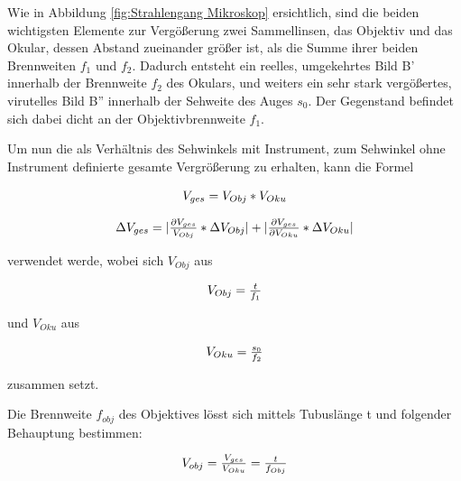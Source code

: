 \documentclass[12pt,a4paper,twoside]{article}
\begin{document}
\noindent
Wie in Abbildung \ref{fig:Strahlengang Mikroskop} ersichtlich, sind die beiden wichtigsten Elemente zur Vergößerung zwei Sammellinsen, das Objektiv und das Okular, dessen Abstand zueinander größer ist, als die Summe ihrer beiden Brennweiten $f_{1}$ und $f_{2}$. 
Dadurch entsteht ein reelles, umgekehrtes Bild B' innerhalb der Brennweite $f_{2}$ des Okulars, und weiters ein sehr stark vergößertes, virutelles Bild B'' innerhalb der Sehweite des Auges $s_{0}$. Der Gegenstand befindet sich dabei dicht an der Objektivbrennweite $f_{1}$. \newline

\noindent
Um nun die als Verhältnis des Sehwinkels mit Instrument, zum Sehwinkel ohne Instrument definierte gesamte Vergrößerung zu erhalten, kann die Formel

    \begin{equation}
        \label{eq:Gesamtvergrößerung}
        \centerline{$V_{ges}=V_{Obj}*V_{Oku}$}
    \end{equation}

    \begin{equation}
        \label{eq:Unsicherheit_Gesamtvergrößerung}
        \centerline{$\Delta V_{ges} = \vert \frac{\partial V_{ges}}{V_{Obj}} * \Delta V_{Obj} \vert + \vert \frac{\partial V_{ges}}{\partial V_{Oku}} * \Delta V_{Oku} \vert$}
    \end{equation}

\noindent
verwendet werde, wobei sich $V_{Obj}$ aus

\begin{equation}
    \label{eq:Objektivvergrößerung}
    \centerline{$V_{Obj}=\frac{t}{f_{1}}$}
\end{equation}

\noindent
und $V_{Oku}$ aus

\begin{equation}
    \label{eq:Okularvergrößerung}
    \centerline{$V_{Oku}=\frac{s_{0}}{f_{2}}$}
\end{equation}

\noindent
zusammen setzt. \newline

\noindent
Die Brennweite $f_{obj}$ des Objektives lösst sich mittels Tubuslänge t und folgender Behauptung bestimmen:

\begin{equation}
    \label{eq:Objektivbrennweite}
    \centerline{$V_{obj}=\frac{V_{ges}}{V_{Oku}}=\frac{t}{f_{Obj}}$}
\end{equation}
\end{document}

